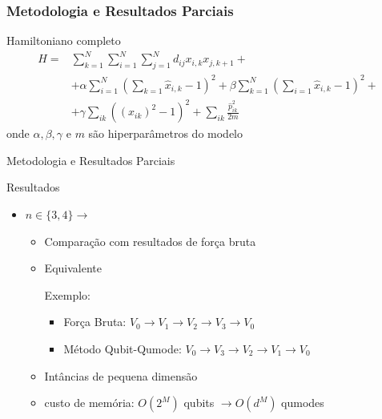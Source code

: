 \documentclass[xcolor={dvipsnames,table}]{beamer}
\begin{document}
\begin{frame}
    \frametitle{Metodologia e Resultados Parciais}

    \begin{block}{Hamiltoniano completo}
        \begin{equation*}
            \begin{split}
                H=&   \sum_{k=1}^{N}\sum_{i=1}^{N}\sum_{j=1}^{N} d_{ij}x_{i,k}x_{j,k+1} + \\ 
                & + \alpha\sum_{i=1}^{N}\left(\sum_{k=1}\hat{x}_{i,k}-1\right)^2 +
                \beta\sum_{k=1}^{N}\left(\sum_{i=1}\hat{x}_{i,k}-1\right)^2 +\\
                & + \gamma\sum_{ik}\left(\left(x_{ik}\right)^2-1\right)^2 
                 + \sum_{ik}\frac{\hat{p}^2_{ik}}{2m}
            \end{split}
        \end{equation*}
        onde $\alpha, \beta,\gamma$ e $m$ são hiperparâmetros do modelo
    \end{block}

\end{frame}

\begin{frame}{Metodologia e Resultados Parciais}
    \begin{block}{Resultados}
        \begin{itemize}
            \item $n\in\{3,4\}\rightarrow$ 
            \begin{itemize}
                \item Comparação com resultados de força bruta
                \item Equivalente 
                
                Exemplo: 
                \begin{itemize}
                    \item Força Bruta: $V_0\rightarrow V_1\rightarrow V_2\rightarrow V_3\rightarrow V_0$
                    \item Método Qubit-Qumode: $V_0\rightarrow V_3\rightarrow V_2\rightarrow V_1\rightarrow V_0$
                \end{itemize}

                \item Intâncias de pequena dimensão
                \item custo de memória: $O(2^M)$ qubits $\rightarrow O(d^M)$ qumodes
            \end{itemize}
        \end{itemize}
    \end{block}
\end{frame}
\end{document}
